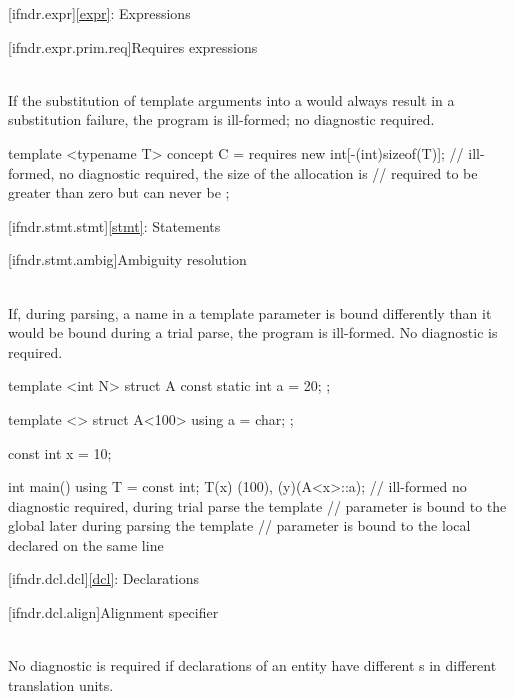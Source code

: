 [ifndr.expr]{\ref{expr}: Expressions}

[ifndr.expr.prim.req]{Requires expressions}

\pnum
{} \\
If the substitution of template arguments into a 
would always result in a substitution failure, the program is ill-formed; no diagnostic required.

\pnum
\begin{example}
\begin{codeblock}
template <typename T> concept C = requires {
  new int[-(int)sizeof(T)]; // ill-formed, no diagnostic required, the size of the allocation is
                            // required to be greater than zero but can never be
};
\end{codeblock}
\end{example}


[ifndr.stmt.stmt]{\ref{stmt}: Statements}

[ifndr.stmt.ambig]{Ambiguity resolution}

\pnum
{} \\
If, during
parsing, a name in a template parameter is bound differently than it would be bound during a trial parse,
the program is ill-formed. No diagnostic is required.

\pnum
\begin{example}
\begin{codeblock}
template <int N> struct A { const static int a = 20; };

template <> struct A<100> { using a = char; };

const int x = 10;

int main() {
  using T = const int;
  T(x)
  (100), (y)(A<x>::a);  // ill-formed no diagnostic required, during trial parse the template
                        // parameter  is bound to the global  later during parsing the template
                        // parameter  is bound to the local  declared on the same line
}
\end{codeblock}
\end{example}


[ifndr.dcl.dcl]{\ref{dcl}: Declarations}

[ifndr.dcl.align]{Alignment specifier}

\pnum
{} \\
No diagnostic is required if declarations of an entity have different s in different
translation units.


